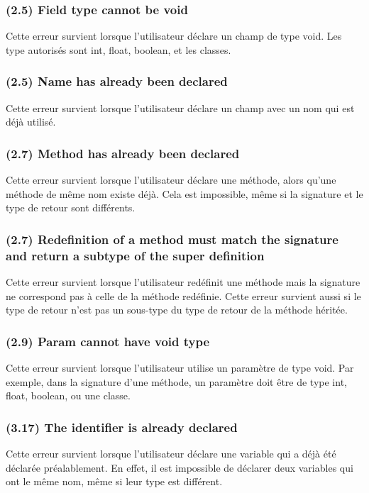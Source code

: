\documentclass[12pt, a4paper, one side]{article}
\begin{document}
    \subsubsection{(2.5) Field type cannot be void}
    Cette erreur survient lorsque l'utilisateur déclare un champ de type void. Les type autorisés sont int, float, boolean, et les classes.

    \subsubsection{(2.5) Name has already been declared}
    Cette erreur survient lorsque l'utilisateur déclare un champ avec un nom qui est déjà utilisé.

    \subsubsection{(2.7) Method has already been declared}
    Cette erreur survient lorsque l'utilisateur déclare une méthode, alors qu'une méthode de même nom existe déjà. Cela est impossible, même si la signature et le type de retour sont différents.

    \subsubsection{(2.7) Redefinition of a method must match the signature and return a subtype of the super definition}
    Cette erreur survient lorsque l'utilisateur redéfinit une méthode mais la signature ne correspond pas à celle de la méthode redéfinie. Cette erreur survient aussi si le type de retour n'est pas un sous-type du type de retour de la méthode héritée.

    \subsubsection{(2.9) Param cannot have void type}
    Cette erreur survient lorsque l'utilisateur utilise un paramètre de type void. Par exemple, dans la signature d'une méthode, un paramètre doit être de type int, float, boolean, ou une classe.

    \subsubsection{(3.17) The identifier is already declared}
    Cette erreur survient lorsque l'utilisateur déclare une variable qui a déjà été déclarée préalablement. En effet, il est impossible de déclarer deux variables qui ont le même nom, même si leur type est différent.
\end{document}
